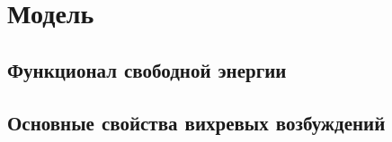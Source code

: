 \chapter{Модель}
\label{ch:2}

\section{Функционал свободной энергии}
\label{sec:2-1}

\section{Основные свойства вихревых возбуждений}
\label{sec:2-2}
